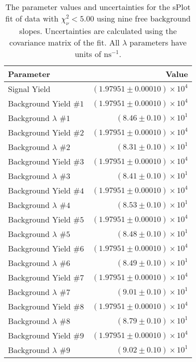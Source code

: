 
\begin{table}[ht]
    \begin{center}
        \begin{tabular}{lr}\toprule
            Parameter & Value \\\midrule
            Signal Yield & $(1.97951 \pm 0.00010) \times 10^{4}$ \\
            Background Yield $\#1$ & $(1.97951 \pm 0.00010) \times 10^{4}$ \\
            Background $\lambda$ $\#1$ & $(8.46 \pm 0.10) \times 10^{1}$ \\
            Background Yield $\#2$ & $(1.97951 \pm 0.00010) \times 10^{4}$ \\
            Background $\lambda$ $\#2$ & $(8.31 \pm 0.10) \times 10^{1}$ \\
            Background Yield $\#3$ & $(1.97951 \pm 0.00010) \times 10^{4}$ \\
            Background $\lambda$ $\#3$ & $(8.41 \pm 0.10) \times 10^{1}$ \\
            Background Yield $\#4$ & $(1.97951 \pm 0.00010) \times 10^{4}$ \\
            Background $\lambda$ $\#4$ & $(8.53 \pm 0.10) \times 10^{1}$ \\
            Background Yield $\#5$ & $(1.97951 \pm 0.00010) \times 10^{4}$ \\
            Background $\lambda$ $\#5$ & $(8.48 \pm 0.10) \times 10^{1}$ \\
            Background Yield $\#6$ & $(1.97951 \pm 0.00010) \times 10^{4}$ \\
            Background $\lambda$ $\#6$ & $(8.49 \pm 0.10) \times 10^{1}$ \\
            Background Yield $\#7$ & $(1.97951 \pm 0.00010) \times 10^{4}$ \\
            Background $\lambda$ $\#7$ & $(9.01 \pm 0.10) \times 10^{1}$ \\
            Background Yield $\#8$ & $(1.97951 \pm 0.00010) \times 10^{4}$ \\
            Background $\lambda$ $\#8$ & $(8.79 \pm 0.10) \times 10^{1}$ \\
            Background Yield $\#9$ & $(1.97951 \pm 0.00010) \times 10^{4}$ \\
            Background $\lambda$ $\#9$ & $(9.02 \pm 0.10) \times 10^{1}$ \\\bottomrule
        \end{tabular}
        \caption{The parameter values and uncertainties for the sPlot fit of data with $\chi^2_\nu < 5.00$ using nine free background slopes. Uncertainties are calculated using the covariance matrix of the fit. All $\lambda$ parameters have units of $\si{\nano\second}^{-1}$.}\label{tab:splot-fit-results-chisqdof-5.00-free-9}
    \end{center}
\end{table}
